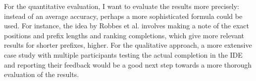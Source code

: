 \documentclass[sigplan,screen]{acmart}
\begin{document}
For the quantitative evaluation, I want to evaluate the results more precisely: instead of an average accuracy, perhaps a more sophisticated formula could be used. For instance, the idea by Robbes et al. \cite{Robb08a} involves making a note of the exact positions and prefix lengths and ranking completions, which give more relevant results for shorter prefixes, higher. For the qualitative approach, a more extensive case study with multiple participants testing the actual completion in the IDE and reporting their feedback would be a good next step towards a more thorough evaluation of the results.



\end{document}
